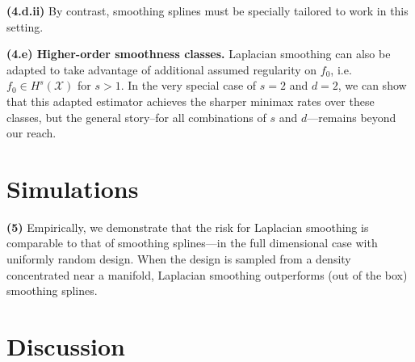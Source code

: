 \documentclass{article}
\newcommand{\1}{\mathbf{1}}
\newcommand{\Xset}{\mathcal{X}}
\newcommand{\mc}[1]{\mathcal{#1}}
\theoremstyle{alden}
\theoremstyle{aldenthm}
\theoremstyle{definition}
\theoremstyle{remark}
\begin{document}
\quad \textbf{(4.d.ii)} By contrast, smoothing splines must be specially tailored to work in this setting.

\textbf{(4.e) Higher-order smoothness classes.} Laplacian smoothing can also be adapted to take advantage of additional assumed regularity on $f_0$, i.e. $f_0 \in H^s(\mc{\Xset})$ for $s > 1$. In the very special case of $s = 2$ and $d = 2$, we can show that this adapted estimator achieves the sharper minimax rates over these classes, but the general story--for all combinations of $s$ and $d$---remains beyond our reach.

\section{Simulations}

\quad \textbf{(5)} Empirically, we demonstrate that the risk for Laplacian smoothing is comparable to that of smoothing splines---in the full dimensional case with uniformly random design. When the design is sampled from a density concentrated near a manifold, Laplacian smoothing outperforms (out of the box) smoothing splines.

\section{Discussion}

\clearpage


 
\end{document}
